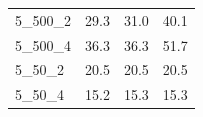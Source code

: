\begin{tabular}{lrrr}
 5\_500\_2 &                   29.3 &                                               31.0 &                                               40.1 \\
 5\_500\_4 &                   36.3 &                                               36.3 &                                               51.7 \\
  5\_50\_2 &                   20.5 &                                               20.5 &                                               20.5 \\
  5\_50\_4 &                   15.2 &                                               15.3 &                                               15.3 \\
\bottomrule
\end{tabular}
